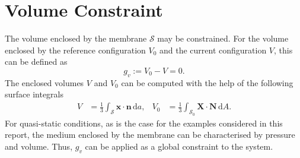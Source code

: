 \section{Volume Constraint}
The volume enclosed by the membrane $\mathcal{S}$ may be constrained. For the volume enclosed by the reference configuration $V_{0}$
 and the current configuration $V$, this can be defined as
 \begin{equation}\label{vol_constraint_def}
    g_{v} := V_{0} - V = 0.
 \end{equation}
 The enclosed volumes $V$ and $V_{0}$ can be computed with the help of the following surface integrals
 \begin{align} \label{volume_definition}
    V &= \frac{1}{3} \int_{\mathcal{S}} \boldsymbol{x} \cdot \boldsymbol{n} \,\mathrm{d}a, & V_{0} &= \frac{1}{3} \int_{\mathcal{S_{0}}} \boldsymbol{X} \cdot \boldsymbol{N}\,\mathrm{d}A.
 \end{align}
For quasi-static conditions, as is the case for the examples considered in this report,
 the medium enclosed by the membrane can be characterised by pressure and volume. Thus, $g_{v}$ can be applied as a global constraint to the system. 
%
%
